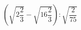 \begin{ex}
	\begin{condition}
		\( \left( \sqrt{2\dfrac{2}{3}}-\sqrt{16\dfrac{2}{3}} \right):\sqrt{\dfrac{2}{75}} \)
	\end{condition}
\end{ex}